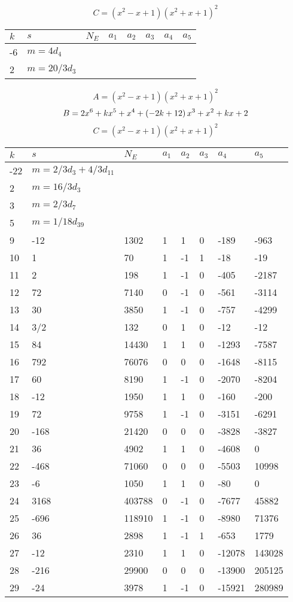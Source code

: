 \documentclass{amsart}
\begin{document}
$$C=(x^2
 - x
 + 1)(x^2
 + x
 + 1)^{2}$$
\begin{longtable}{|l|l|l|lllll|}
\hline
$k$ & $s$ & $N_E$ & $a_1$ & $a_2$ & $a_3$ & $a_4$ & $a_5$\\
\hline
-6&$m=4d_{4}$&&\multicolumn{5}{c|}{}\\
2&$m=20/3d_{3}$&&\multicolumn{5}{c|}{}\\
\hline
\end{longtable}
$$A=(x^2
 - x
 + 1)(x^2
 + x
 + 1)^{2}$$
$$B=2\*x^6
 + k\*x^5
 + x^4
 + \left(-2\*k
 + 12\right) \*x^3
 + x^2
 + k\*x
 + 2$$
$$C=(x^2
 - x
 + 1)(x^2
 + x
 + 1)^{2}$$
\begin{longtable}{|l|l|l|lllll|}
\hline
$k$ & $s$ & $N_E$ & $a_1$ & $a_2$ & $a_3$ & $a_4$ & $a_5$\\
\hline
-22&$m=2/3d_{3}+4/3d_{11}$&&\multicolumn{5}{c|}{}\\
2&$m=16/3d_{3}$&&\multicolumn{5}{c|}{}\\
3&$m=2/3d_{7}$&&\multicolumn{5}{c|}{}\\
5&$m=1/18d_{39}$&&\multicolumn{5}{c|}{}\\
9&-12&1302&1&1&0&-189&-963\\
10&1&70&1&-1&1&-18&-19\\
11&2&198&1&-1&0&-405&-2187\\
12&72&7140&0&-1&0&-561&-3114\\
13&30&3850&1&-1&0&-757&-4299\\
14&3/2&132&0&1&0&-12&-12\\
15&84&14430&1&1&0&-1293&-7587\\
16&792&76076&0&0&0&-1648&-8115\\
17&60&8190&1&-1&0&-2070&-8204\\
18&-12&1950&1&1&0&-160&-200\\
19&72&9758&1&-1&0&-3151&-6291\\
20&-168&21420&0&0&0&-3828&-3827\\
21&36&4902&1&1&0&-4608&0\\
22&-468&71060&0&0&0&-5503&10998\\
23&-6&1050&1&1&0&-80&0\\
24&3168&403788&0&-1&0&-7677&45882\\
25&-696&118910&1&-1&0&-8980&71376\\
26&36&2898&1&-1&1&-653&1779\\
27&-12&2310&1&1&0&-12078&143028\\
28&-216&29900&0&0&0&-13900&205125\\
29&-24&3978&1&-1&0&-15921&280989\\

\end{longtable}
\end{document}
